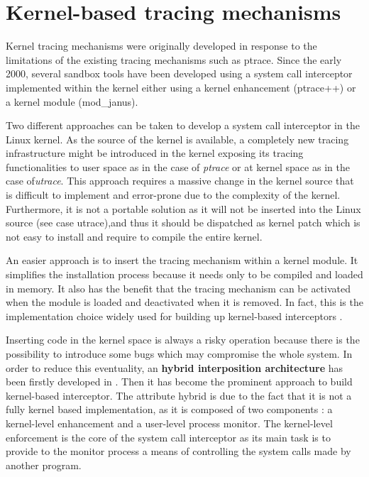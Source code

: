 \chapter{Kernel-based tracing mechanisms}
\label{kernel_mode}

Kernel tracing mechanisms were originally developed in response to the limitations of the existing tracing mechanisms such as ptrace. Since the early 2000, several sandbox tools have been developed using a system call interceptor implemented within the kernel \cite{Janus,Noordende_asecure,systrace,Garfinkel03ostia:a} either using a kernel enhancement (ptrace++) or a kernel module (mod\_janus).

Two different approaches can be taken to develop a system call interceptor in the Linux kernel. As the source of the kernel is available, a completely new tracing infrastructure might be introduced in the kernel exposing its tracing functionalities to user space as in the case of \textit{ptrace} or at kernel space as in the case of\textit{utrace}. This approach requires a massive change in the kernel source that is difficult to implement and error-prone due to the complexity of the kernel. Furthermore, it is not a portable solution as it will not be inserted into the Linux source (see case utrace),and thus it should be dispatched as kernel patch which is not easy to install and require to compile the entire kernel. 

An easier approach is to insert the tracing mechanism within a kernel module. It simplifies the installation process because it needs only to be compiled and loaded in memory. It also has the benefit that the tracing mechanism can be activated when the module is loaded and deactivated when it is removed. In fact, this is the implementation choice widely used for building up  kernel-based interceptors \cite{Janus,Noordende_asecure,systrace}. 


Inserting code in the kernel space is always a risky operation because there is the possibility to introduce some bugs which may compromise the whole system. In order to reduce this eventuality, an \textbf{hybrid interposition architecture} has been firstly developed in \cite{Janus}. Then it has become the prominent approach to build kernel-based interceptor. The attribute hybrid is due to the fact that it is not a fully kernel based implementation, as it is composed of two components : a kernel-level enhancement and a user-level process monitor. The kernel-level enforcement is the core of the system call interceptor as its main task is to provide to the monitor process a means of controlling the system calls made by another program. 

